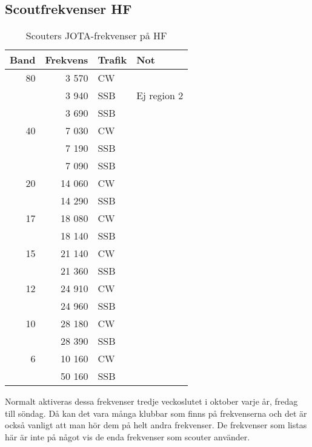 \subsection{Scoutfrekvenser HF}

\begin{table}[H]
\centering
\begin{tabular}{rrll}
	\textbf{Band} & \textbf{Frekvens} & \textbf{Trafik} & \textbf{Not} \\ \hline

               80 & 3 570  & CW  &             \\
	              & 3 940  & SSB & Ej region 2 \\
	              & 3 690  & SSB &             \\ \hline
	           40 & 7 030  & CW  &             \\
	              & 7 190  & SSB &             \\
	              & 7 090  & SSB &             \\ \hline
	           20 & 14 060 & CW  &             \\
	              & 14 290 & SSB &             \\ \hline
	           17 & 18 080 & CW  &             \\
	              & 18 140 & SSB &             \\ \hline
	           15 & 21 140 & CW  &             \\
	              & 21 360 & SSB &             \\ \hline
	           12 & 24 910 & CW  &             \\
	              & 24 960 & SSB &             \\ \hline
	           10 & 28 180 & CW  &             \\
	              & 28 390 & SSB &             \\ \hline
	            6 & 10 160 & CW  &             \\
	              & 50 160 & SSB &             \\ \hline
\end{tabular}
\caption{Scouters JOTA-frekvenser på HF}
\end{table}

Normalt aktiveras dessa frekvenser tredje veckoslutet i oktober varje år,
fredag till söndag. Då kan det vara många klubbar som finns på frekvenserna
och det är också vanligt att man hör dem på helt andra frekvenser. De
frekvenser som listas här är inte på något vis de enda frekvenser som scouter
använder.
